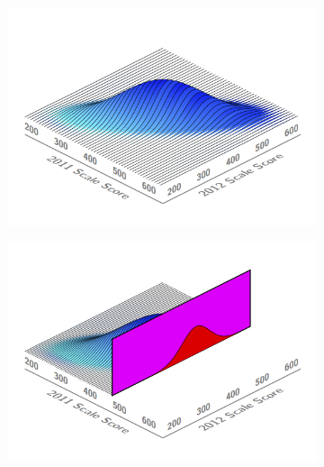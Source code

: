 \documentclass[12pt]{article}
\begin{document}
\begin{figure}[H]
\caption*{\label{fig:Bidensity} {\bf{Fig. B.1:}} Depiction of the distribution associated with 2011 and 2012 student scale scores together with the conditional distribution and associated growth percentile.}
  \begin{subfigure}[b]{0.5\textwidth}
    \includegraphics[width=\textwidth]{../img/Appendices/SGP_Method/bidensity_p1.jpg}
  \end{subfigure}
  \begin{subfigure}[b]{0.5\textwidth}
    \includegraphics[width=\textwidth]{../img/Appendices/SGP_Method/bidensity_p2.jpg}
  \end{subfigure}
  \begin{subfigure}[b]{0.5\textwidth}

\end{subfigure}
\end{figure}
\end{document}
